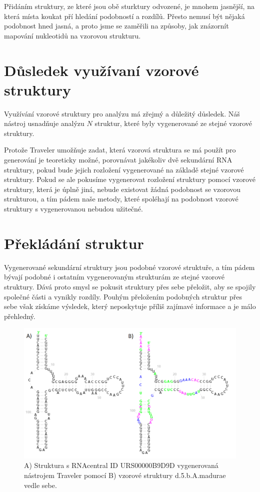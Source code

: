 Přidáním struktury, ze které jsou obě sturktury odvozené, je mnohem jasnější,
na která místa koukat pří hledání podobností a rozdílů. Přesto nemusí být
nějaká podobnost hned jasná, a proto jsme se zaměřili na způsoby, jak znázornít
mapování nukleotidů na vzorovou strukturu.

\section{Důsledek využívaní vzorové struktury}

Využívání vzorové struktury pro analýzu má zřejmý a důležitý důsledek. Náš
nástroj usnadňuje analýzu $N$ struktur, které byly vygenerované ze stejné
vzorové struktury. 

Protože Traveler umožňuje zadat, která vzorová struktura se má použít pro
generování je teoreticky možné, porovnávat jakékoliv dvě sekundární RNA
struktury, pokud bude jejich rozložení vygenerované na základě stejné vzorové
struktury. Pokud se ale pokusíme vygenerovat rozložení struktury pomocí vzorové
struktury, která je úplně jiná, nebude existovat žádná podobnost se vzorovou
strukturou, a tím pádem naše metody, které spoléhají na podobnost vzorové
struktury s vygenerovanou nebudou užitečné.

\section{Překládání struktur}

Vygenerované sekundární struktury jsou podobné vzorové struktuře, a tím pádem
bývají podobné i ostatním vygenerovaným strukturám ze stejné vzorové struktury.
Dává proto smysl se pokusit struktury přes sebe přeložit, aby se spojily
společné části a vynikly rozdíly. Pouhým přeložením podobných struktur přes
sebe však získáme výsledek, který neposkytuje příliš zajímavé informace a je
málo přehledný.

\begin{figure}[H]
  \centering
  \includegraphics[width=140mm]{../img/kap02/align/structures.png}
  \caption{A) Struktura s RNAcentral ID URS00000B9D9D vygenerovaná nástrojem
  Traveler pomocí B) vzorové struktury d.5.b.A.madurae vedle sebe.}
\end{figure}

